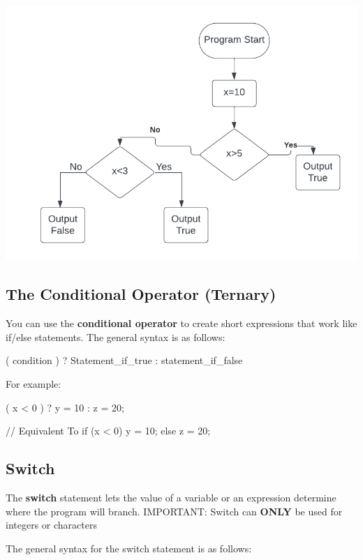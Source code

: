 \documentclass{report}
\begin{document}
    \begin{minipage}[]{0.3\textwidth}
        \begin{center}
            \includegraphics[scale=0.5]{./figures/flowchart3.png}
        \end{center} 
    \end{minipage}


    \bigbreak \noindent 
    \subsection{The Conditional Operator (Ternary)} 
    \bigbreak \noindent 
    \begin{concept}
 You can use the \textbf{conditional operator} to create short expressions that work like if/else statements. The general syntax is as follows:
	\end{concept}
    \smallbreak \noindent
    
    \begin{cppcode}
                            ( condition ) ? Statement_if_true :  statement_if_false
    \end{cppcode}
    
    \bigbreak \noindent 
    For example:
    \smallbreak \noindent
    
    \begin{cppcode}
( x < 0 ) ? y = 10 : z = 20;  

// Equivalent To
if (x < 0) {
    y = 10;
}else {
    z = 20;
}
    \end{cppcode}
    

    \pagebreak \bigbreak \noindent 
    \subsection{Switch}
    \bigbreak \noindent 
    \begin{concept}
 The \textbf{switch} statement lets the value of a variable or an expression determine where the program will branch. IMPORTANT: Switch can \textbf{ONLY} be used for integers or characters
	\end{concept}
    \bigbreak \noindent 
    The general syntax for the switch statement is as follows:
    \bigbreak \noindent 
    
\end{document}
